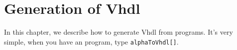 \chapter{Generation of {\sc Vhdl}}
\label{chapvhdl}

In this chapter, we describe how to generate {\sc Vhdl} from {\alfhard}
programs. It's very simple, when you have an {\alphard} program, type 
{\tt alphaToVhdl[]}.

